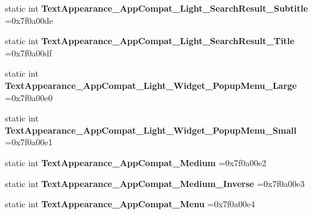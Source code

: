 \begin{DoxyCompactItemize}
static int {\bfseries Text\+Appearance\+\_\+\+App\+Compat\+\_\+\+Light\+\_\+\+Search\+Result\+\_\+\+Subtitle} =0x7f0a00de
\item 
\mbox{\label{classandroid_1_1support_1_1v7_1_1mediarouter_1_1R_1_1style_a504575f4573148607d5faf47e731e618}} 
static int {\bfseries Text\+Appearance\+\_\+\+App\+Compat\+\_\+\+Light\+\_\+\+Search\+Result\+\_\+\+Title} =0x7f0a00df
\item 
\mbox{\label{classandroid_1_1support_1_1v7_1_1mediarouter_1_1R_1_1style_afdbcf526d4af12fa76b023ace2fa7487}} 
static int {\bfseries Text\+Appearance\+\_\+\+App\+Compat\+\_\+\+Light\+\_\+\+Widget\+\_\+\+Popup\+Menu\+\_\+\+Large} =0x7f0a00e0
\item 
\mbox{\label{classandroid_1_1support_1_1v7_1_1mediarouter_1_1R_1_1style_ab84935596967789d8d6d97131f49d87c}} 
static int {\bfseries Text\+Appearance\+\_\+\+App\+Compat\+\_\+\+Light\+\_\+\+Widget\+\_\+\+Popup\+Menu\+\_\+\+Small} =0x7f0a00e1
\item 
\mbox{\label{classandroid_1_1support_1_1v7_1_1mediarouter_1_1R_1_1style_a576dcfa7e31dcd4cc5f2a8dac3de5c45}} 
static int {\bfseries Text\+Appearance\+\_\+\+App\+Compat\+\_\+\+Medium} =0x7f0a00e2
\item 
\mbox{\label{classandroid_1_1support_1_1v7_1_1mediarouter_1_1R_1_1style_ab0bf4ff9a1beb4ebd231e1699f47296d}} 
static int {\bfseries Text\+Appearance\+\_\+\+App\+Compat\+\_\+\+Medium\+\_\+\+Inverse} =0x7f0a00e3
\item 
\mbox{\label{classandroid_1_1support_1_1v7_1_1mediarouter_1_1R_1_1style_a74112765db3f890000b384a33e70d44f}} 
static int {\bfseries Text\+Appearance\+\_\+\+App\+Compat\+\_\+\+Menu} =0x7f0a00e4
\item 
\mbox{\label{classandroid_1_1support_1_1v7_1_1mediarouter_1_1R_1_1style_a2756c6c031a1d0617e3510f2f0e54f47}} 

\end{DoxyCompactItemize}
